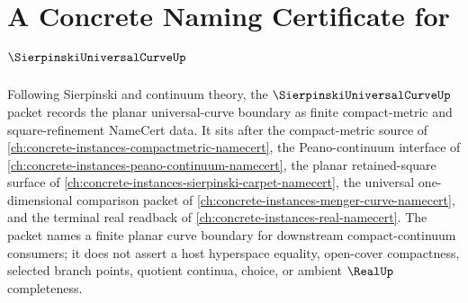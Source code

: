 \chapter{A Concrete Naming Certificate for $\SierpinskiUniversalCurveUp$}
\label{ch:concrete-instances-sierpinski-universal-curve-namecert}

Following Sierpinski and continuum theory, the $\SierpinskiUniversalCurveUp$ packet records the planar universal-curve boundary as finite compact-metric and square-refinement NameCert data. It sits after the compact-metric source of \autoref{ch:concrete-instances-compactmetric-namecert}, the Peano-continuum interface of \autoref{ch:concrete-instances-peano-continuum-namecert}, the planar retained-square surface of \autoref{ch:concrete-instances-sierpinski-carpet-namecert}, the universal one-dimensional comparison packet of \autoref{ch:concrete-instances-menger-curve-namecert}, and the terminal real readback of \autoref{ch:concrete-instances-real-namecert}. The packet names a finite planar curve boundary for downstream compact-continuum consumers; it does not assert a host hyperspace equality, open-cover compactness, selected branch points, quotient continua, choice, or ambient $\RealUp$ completeness.

